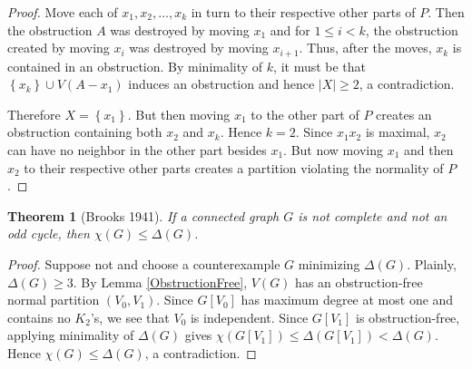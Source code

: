 \documentclass[12pt]{amsart}
\theoremstyle{plain}
\newtheorem{thm}{Theorem}
\theoremstyle{definition}
\theoremstyle{remark}
\newcommand{\set}[1]{\left\{ #1 \right\}}
\newcommand{\card}[1]{\left|#1\right|}
\begin{document}
\begin{proof}
Move each of $x_1, x_2, \ldots, x_k$ in turn to their respective other parts of $P$.  Then the obstruction $A$ was destroyed by moving $x_1$ and for $1 \leq i < k$, the obstruction created by moving $x_i$ was destroyed by moving $x_{i+1}$.  Thus, after the moves, $x_k$ is contained in an obstruction.  By minimality of $k$, it must be that $\set{x_k} \cup V(A - x_1)$ induces an obstruction and hence $\card{X} \geq 2$, a contradiction.

Therefore $X = \set{x_1}$.  But then moving $x_1$ to the other part of $P$ creates an obstruction containing both $x_2$ and $x_k$.  Hence $k = 2$.
Since $x_1x_2$ is maximal, $x_2$ can have no neighbor in the other part besides $x_1$.  But now moving $x_1$ and then $x_2$ to their respective other parts creates a partition violating the normality of $P$.
\end{proof}

\begin{thm}[Brooks 1941]
If a connected graph $G$ is not complete and not an odd cycle, then
$\chi(G) \leq \Delta(G)$.
\end{thm}
\begin{proof}
Suppose not and choose a counterexample $G$ minimizing $\Delta(G)$. 
Plainly, $\Delta(G) \geq 3$.  By Lemma \ref{ObstructionFree}, $V(G)$ has an
obstruction-free normal partition $(V_0, V_1)$.  
Since $G[V_0]$ has maximum degree at most one and contains no
$K_2$'s, we see that $V_0$ is independent.  Since $G[V_1]$ is obstruction-free,
applying minimality of $\Delta(G)$ gives $\chi(G[V_1]) \leq \Delta(G[V_1]) <
\Delta(G)$.  Hence $\chi(G) \leq \Delta(G)$, a contradiction.
\end{proof}
\end{document}

